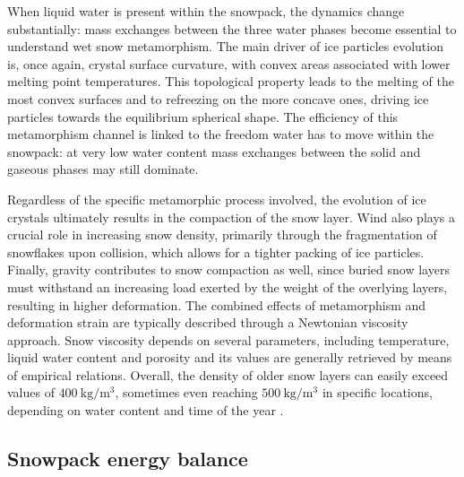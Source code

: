 When liquid water is present within the snowpack, the dynamics change substantially: mass exchanges between the three water phases become essential to 
understand wet snow metamorphism. The main driver of ice particles evolution is, once again, crystal surface curvature, with convex areas associated with 
lower melting point temperatures. This topological property leads to the melting of the most convex surfaces and to refreezing on the more concave ones, 
driving ice particles towards the equilibrium spherical shape. The efficiency of this metamorphism channel is linked to the freedom water has to move 
within the snowpack: at very low water content mass exchanges between the solid and gaseous phases may still dominate.

Regardless of the specific metamorphic process involved, the evolution of ice crystals ultimately results in the compaction of the snow layer. Wind also 
plays a crucial role in increasing snow density, primarily through the fragmentation of snowflakes upon collision, which allows for a tighter packing of 
ice particles. Finally, gravity contributes to snow compaction as well, since buried snow layers must withstand an increasing load exerted by the weight 
of the overlying layers, resulting in higher deformation. The combined effects of metamorphism and deformation strain are typically described 
through a Newtonian viscosity approach. Snow viscosity depends on several parameters, including temperature, liquid water content and porosity and its
values are generally retrieved by means of empirical relations. Overall, the density of older snow layers can easily exceed values of $\SI{400}{\kilo\gram\per\meter\cubed}$, 
sometimes even reaching $\SI{500}{\kilo\gram\per\meter\cubed}$ in specific locations, depending on water content and time of the year \parencite{rho_max}.



\subsection{Snowpack energy balance}
\label{subsec:snow_energy_balance}

